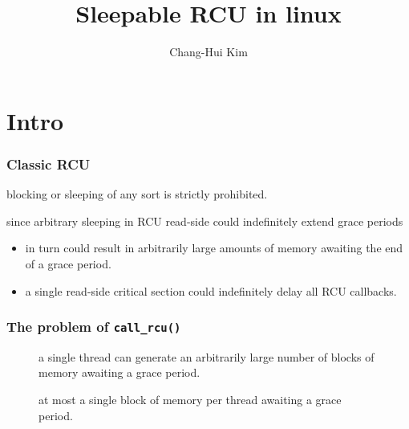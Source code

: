 \documentclass{beamer}
\title{Sleepable RCU in linux}
\author{Chang-Hui Kim}
\begin{document}
\begin{frame}
  \titlepage
\end{frame}


\section{Intro}



\begin{frame}[t]
  \frametitle{Classic RCU}

  \begin{center}
    blocking or sleeping of any sort is strictly prohibited.
  \end{center}

  since arbitrary sleeping in RCU read-side could indefinitely extend grace periods

  \begin{itemize}
  \item in turn could result in arbitrarily large amounts of memory awaiting the end
    of a grace period.
  \item a single read-side critical section could indefinitely delay all RCU callbacks.
  \end{itemize}

\end{frame}


\begin{frame}[t]
  \frametitle{The problem of \texttt{call\_rcu()}}

  \begin{figure}
    
    \caption{a single thread can generate an arbitrarily large number of
      blocks of memory awaiting a grace period.}
  \end{figure}

  \begin{figure}
    
    \caption{at most a single block of memory per thread awaiting a grace period.}
  \end{figure}
  
\end{frame}
\end{document}
